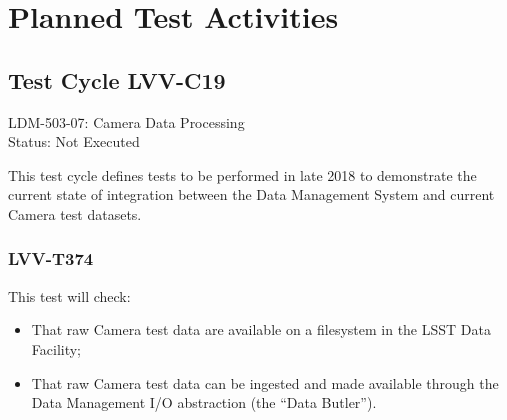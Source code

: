 \documentclass[DM,lsstdraft,STR,toc]{lsstdoc}
\providecommand{\tightlist}{
  \setlength{\itemsep}{0pt}\setlength{\parskip}{0pt}}
\begin{document}
\newpage
\section{Planned Test Activities}
\label{sect:plannedtestactivities}


\subsection{Test Cycle LVV-C19}

LDM-503-07: Camera Data Processing\\
Status: Not Executed


This test cycle defines tests to be performed in late 2018 to
demonstrate the current state of integration between the Data Management
System and current Camera test datasets.

\subsubsection{LVV-T374}

This test will check:

\begin{itemize}
\tightlist
\item
  That raw Camera test data are available on a filesystem in the LSST
  Data Facility;
\item
  That raw Camera test data can be ingested and made available through
  the Data Management I/O abstraction (the ``Data Butler'').
\end{itemize}
\end{document}

